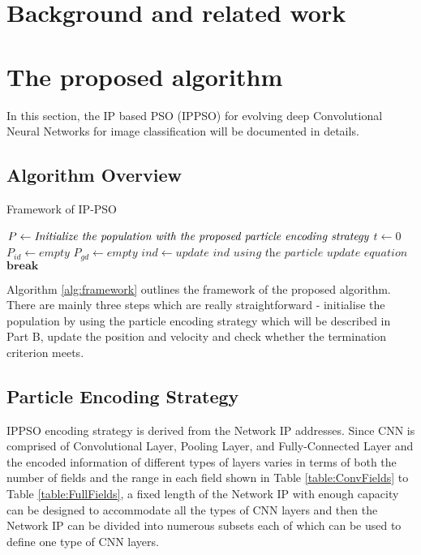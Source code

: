 \documentclass[conference]{IEEEtran}
\begin{document}
\section{Background and related work}


\section{The proposed algorithm}
In this section, the IP based PSO (IPPSO) for evolving deep Convolutional Neural Networks for image classification will be documented in details. 


\subsection{Algorithm Overview}
\begin{algorithm}
	\caption{Framework of IP-PSO}
	\label{alg:framework}
	\begin{algorithmic}
		\renewcommand{\algorithmicrequire}{\textbf{Input:}}
		\renewcommand{\algorithmicensure}{\textbf{Output:}}
		\STATE $P \leftarrow \textit{Initialize the population with the proposed particle}\linebreak \textit{ encoding strategy}$
		\STATE $t \leftarrow 0$
		\STATE $P_{id} \leftarrow empty$
		\STATE $P_{gd} \leftarrow empty$
		\STATE $ind \leftarrow \textit{update ind using the particle update equation}$
		\STATE $\textbf{break}$
		\ENDIF
		\ENDFOR
		\ENDWHILE		
	\end{algorithmic}
\end{algorithm}

Algorithm \ref{alg:framework} outlines the framework of the proposed algorithm. There are mainly three steps which are really straightforward - initialise the population by using the particle encoding strategy which will be described in Part B, update the position and velocity and check whether the termination criterion meets.

\subsection{Particle Encoding Strategy}
IPPSO encoding strategy is derived from the Network IP addresses. Since CNN is comprised of Convolutional Layer, Pooling Layer, and Fully-Connected Layer and the encoded information of different types of layers varies in terms of both the number of fields and the range in each field shown in Table \ref{table:ConvFields} to Table \ref{table:FullFields}, a fixed length of the Network IP with enough capacity can be designed to accommodate all the types of CNN layers and then the Network IP can be divided into numerous subsets each of which can be used to define one type of CNN layers. 
\end{document}
